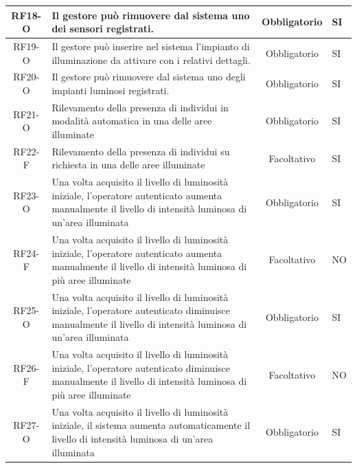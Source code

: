 \documentclass[a4paper, 11pt]{article}
\begin{document}
\begin{longtable}{|c|p{7cm}|c|p{4cm}|}
    \hline
    RF18-O          & Il gestore può rimuovere dal sistema uno dei sensori registrati.                                                                                              & Obbligatorio       & SI                   \\
    \hline
    RF19-O          & Il gestore può inserire nel sistema l'impianto di illuminazione da attivare con i relativi dettagli.                                                          & Obbligatorio       & SI                   \\
    \hline
    RF20-O          & Il gestore può rimuovere dal sistema uno degli impianti luminosi registrati.                                                                                  & Obbligatorio       & SI                   \\
    \hline
    RF21-O          & Rilevamento della presenza di individui in modalità automatica in una delle aree illuminate                                                                   & Obbligatorio       & SI                   \\
    \hline
    RF22-F          & Rilevamento della presenza di individui su richiesta in una delle aree illuminate                                                                             & Facoltativo        & SI                   \\
    \hline
    RF23-O          & Una volta acquisito il livello di luminosità iniziale, l'operatore autenticato aumenta manualmente il livello di intensità luminosa di un'area illuminata     & Obbligatorio       & SI                   \\
    \hline
    RF24-F          & Una volta acquisito il livello di luminosità iniziale, l'operatore autenticato aumenta manualmente il livello di intensità luminosa di più aree illuminate    & Facoltativo        & NO                   \\
    \hline
    RF25-O          & Una volta acquisito il livello di luminosità iniziale, l'operatore autenticato diminuisce manualmente il livello di intensità luminosa di un'area illuminata  & Obbligatorio       & SI                   \\
    \hline
    RF26-F          & Una volta acquisito il livello di luminosità iniziale, l'operatore autenticato diminuisce manualmente il livello di intensità luminosa di più aree illuminate & Facoltativo        & NO                   \\
    \hline
    RF27-O          & Una volta acquisito il livello di luminosità iniziale, il sistema aumenta automaticamente il livello di intensità luminosa di un'area illuminata              & Obbligatorio       & SI                   \\

\end{longtable}
\end{document}
